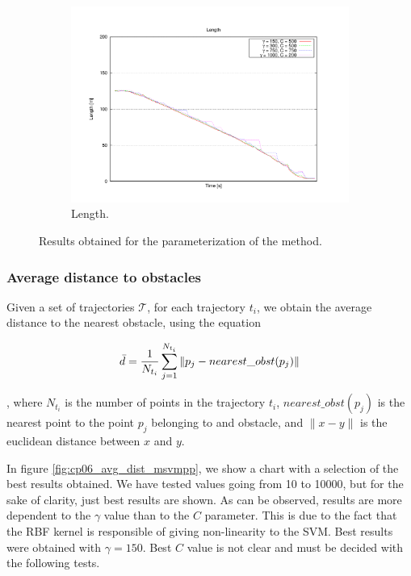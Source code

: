 \begin{figure}
  \ContinuedFloat
  \begin{subfigure}[b]{\textwidth}
	  \centering
	  \includegraphics[width=\textwidth, trim=55 50 85 60,clip]{figure10}
	  \caption{Length.}
	  \label{fig:cp06_length_msvmpp}
  \end{subfigure}
  
  \caption{Results obtained for the parameterization of the method.}\label{fig:cp06_results_parameterization}
\end{figure}

\subsubsection{Average distance to obstacles}\label{ch:chapter06_02_01_01}
Given a set of trajectories $\mathcal{T}$, for each trajectory $t_i$, we obtain the average distance to the nearest obstacle, using the equation

\begin{equation}\label{eq:cp06_avg_dist}
  \bar{d} = {1 \over N_{t_i}} \sum_{j=1}^{N_{t_i}} \| p_j - nearest\_obst(p_j) \|
\end{equation}

, where $N_{t_i}$ is the number of points in the trajectory $t_i$, $nearest\_obst(p_j)$ is the nearest point to the point $p_j$ belonging to and obstacle, and $\| x - y \|$ is the euclidean distance between $x$ and $y$.

In figure \ref{fig:cp06_avg_dist_msvmpp}, we show a chart with a selection of the best results obtained. We have tested values going from 10 to 10000, but for the sake of clarity, just best results are shown. As can be observed, results are more dependent to the $\gamma$ value than to the $C$ parameter. This is due to the fact that the \ac{RBF} kernel is responsible of giving non-linearity to the \ac{SVM}. Best results were obtained with $\gamma = 150$. Best $C$ value is not clear and must be decided with the following tests.

